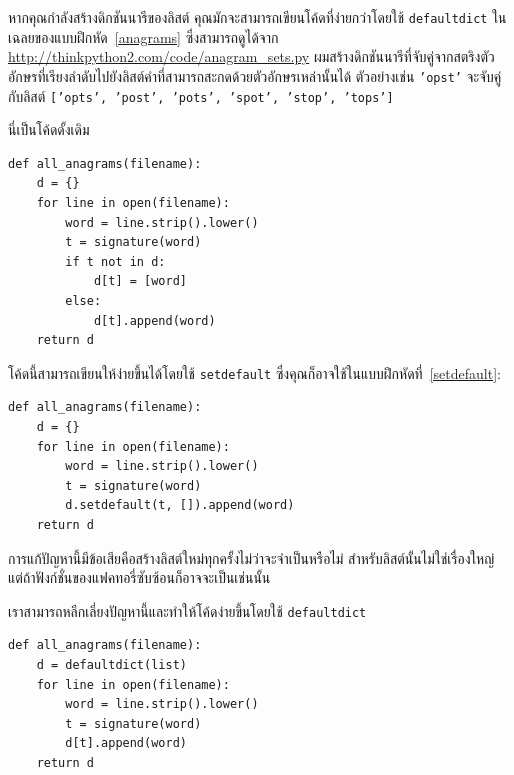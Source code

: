 หากคุณกำลังสร้างดิกชันนารีของลิสต์ คุณมักจะสามารถเขียนโค้ดที่ง่ายกว่าโดยใช้ {\tt defaultdict} 
ในเฉลยของแบบฝึกหัด~\ref{anagrams} 
ซึ่งสามารถดูได้จาก \url{http://thinkpython2.com/code/anagram_sets.py} 
ผมสร้างดิกชันนารีที่จับคู่จากสตริงตัวอักษรที่เรียงลำดับไปยังลิสต์คำที่สามารถสะกดด้วยตัวอักษรเหล่านั้นได้ 
ตัวอย่างเช่น {\tt 'opst'} จะจับคู่กับลิสต์ {\tt ['opts', 'post', 'pots', 'spot', 'stop', 'tops']}


นี่เป็นโค้ดดั้งเดิม

\begin{verbatim}
def all_anagrams(filename):
    d = {}
    for line in open(filename):
        word = line.strip().lower()
        t = signature(word)
        if t not in d:
            d[t] = [word]
        else:
            d[t].append(word)
    return d
\end{verbatim}


โค้ดนี้สามารถเขียนให้ง่ายขึ้นได้โดยใช้ {\tt setdefault} ซึ่งคุณก็อาจใช้ในแบบฝึกหัดที่~\ref{setdefault}:

\begin{verbatim}
def all_anagrams(filename):
    d = {}
    for line in open(filename):
        word = line.strip().lower()
        t = signature(word)
        d.setdefault(t, []).append(word)
    return d
\end{verbatim}

การแก้ปัญหานี้มีข้อเสียคือสร้างลิสต์ใหม่ทุกครั้งไม่ว่าจะจำเป็นหรือไม่ สำหรับลิสต์นั้นไม่ใช่เรื่องใหญ่ แต่ถ้าฟังก์ชั่นของแฟคทอรี่ซับซ้อนก็อาจจะเป็นเช่นนั้น


เราสามารถหลีกเลี่ยงปัญหานี้และทำให้โค้ดง่ายขึ้นโดยใช้ {\tt defaultdict}

\begin{verbatim}
def all_anagrams(filename):
    d = defaultdict(list)
    for line in open(filename):
        word = line.strip().lower()
        t = signature(word)
        d[t].append(word)
    return d
\end{verbatim}


